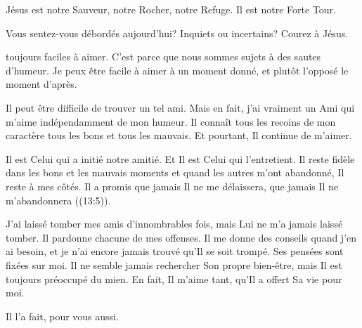 Jésus est notre Sauveur, notre Rocher, notre Refuge. Il est notre Forte Tour. 

Vous sentez-vous débordés aujourd'hui? Inquiets 
 ou incertains? Courez à Jésus. 

\dvrule







 toujours faciles à aimer.
 C'est parce que nous sommes sujets à des sautes d'humeur.
 Je peux être facile à aimer à un moment donné,
 et plutôt l'opposé le moment d'après.


Il peut être difficile de trouver un tel ami. Mais en fait,
 j'ai vraiment un Ami qui m'aime indépendamment de mon humeur.
 Il connaît tous les recoins de mon caractère
 \ocadr tous les bons et tous les mauvais.
 Et pourtant, Il continue de m'aimer.

Il est Celui qui a initié notre amitié. Et Il est Celui qui l'entretient.
 Il reste fidèle dans les bons et les mauvais moments et quand les autres
 m'ont abandonné, Il reste à mes côtés. Il a promis que jamais
 Il ne me délaissera, que jamais Il ne m'abandonnera ((13:5)).

J'ai laissé tomber mes amis d'innombrables fois, mais Lui ne m'a jamais laissé
 tomber. Il pardonne chacune de mes offenses. Il me donne des conseils
 quand j'en ai besoin, et je n'ai encore jamais trouvé qu'Il se soit trompé.
 Ses pensées sont fixées sur moi. 
 Il ne semble jamais rechercher 
 Son propre bien-être, mais Il est toujours préoccupé du mien.
 En fait, Il m'aime tant, qu'Il a offert Sa vie pour moi.

Il l'a fait, pour vous aussi.

\dvrule



